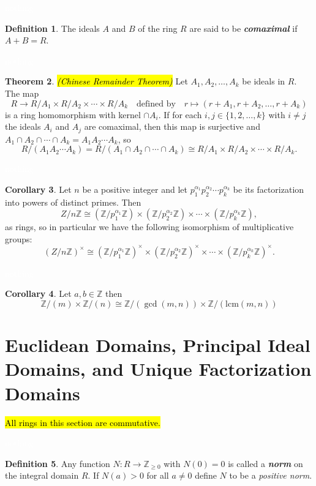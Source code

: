 \documentclass{article}
\theoremstyle{definition}
\newtheorem{thm}{Theorem}[section]
\newtheorem{cor}[thm]{Corollary}
\newtheorem{defn}[thm]{Definition}
\newcommand{\nl}{\textcolor{white}{nothing}}
\newcommand{\ra}{\rightarrow}
\newcommand{\Z}{\mathbb{Z}}
\newcommand{\al}{\alpha}
\begin{document}
\nl

\begin{defn}
The ideals $A$ and $B$ of the ring $R$ are said to be \textbf{\textit{comaximal}} if $A + B = R$.
\end{defn}

\nl

\begin{thm}\hl{\textit{(Chinese Remainder Theorem)}} Let $A_1,A_2,\ldots,A_k$ be ideals in $R$. The map
\[R\ra R/A_1\times R/A_2\times\cdots\times R/A_k\quad\text{defined by}\quad r\mapsto(r+A_1,r+A_2,\ldots,r+A_k)\]
is a ring homomorphism with kernel $\cap A_i$. If for each $i,j\in\{1,2,\ldots,k\}$ with $i\neq j$ the ideals $A_i$ and $A_j$ are comaximal, then this map is surjective and $A_1\cap A_2\cap\cdots\cap A_k = A_1A_2\cdots A_k$, so
\[R/(A_1A_2\cdots A_k) = R/(A_1\cap A_2\cap\cdots\cap A_k) \cong R/A_1\times R/A_2\times\cdots\times R/A_k.\]
\end{thm}

\nl

\begin{cor}
Let $n$ be a positive integer and let $p_1^{\al_1}p_2^{\al_2}\cdots p_k^{\al_k}$ be its factorization into powers of distinct primes. Then
\[Z/n\Z \cong (\Z/p_1^{\al_1}\Z)\times(\Z/p_2^{\al_2}\Z)\times\cdots\times (\Z/p_k^{\al_k}\Z),\]
as rings, so in particular we have the following isomorphism of multiplicative groups:
\[(Z/n\Z)^\times \cong (\Z/p_1^{\al_1}\Z)^\times\times(\Z/p_2^{\al_2}\Z)^\times\times\cdots\times (\Z/p_k^{\al_k}\Z)^\times.\]
\end{cor}

\nl

\begin{cor}
Let $a,b\in \Z$ then
\[\Z/(m)\times \Z/(n) \cong \Z/(\gcd(m,n))\times \Z/(\text{lcm}(m,n))\]
\end{cor}

\section{Euclidean Domains, Principal Ideal Domains, and Unique Factorization Domains}

\hl{All rings in this section are commutative.}

\nl

\begin{defn}
Any function $N:R\ra \Z_{\geq 0}$ with $N(0) = 0$ is called a \textit{\textbf{norm}} on the integral domain $R$. If $N(a)> 0$ for all $a\neq 0$ define $N$ to be a \textit{positive norm}.
\end{defn}
\end{document}
